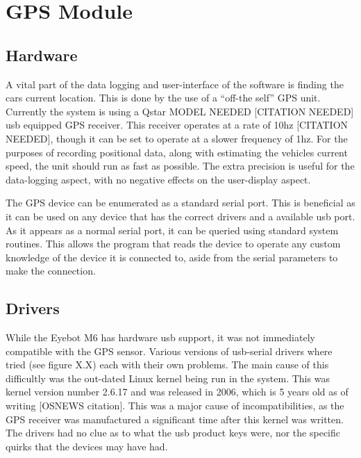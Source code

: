 

\section{GPS Module}

\subsection{Hardware}

A vital part of the data logging and user-interface of the software is finding the cars current location. This is done by the use of a “off-the self” GPS unit. Currently the system is using a Qstar MODEL NEEDED [CITATION NEEDED] usb equipped GPS receiver. This receiver operates at a rate of 10hz [CITATION NEEDED], though it can be set to operate at a slower frequency of 1hz. For the purposes of recording positional data, along with estimating the vehicles current speed, the unit should run as fast as possible. The extra precision is useful for the data-logging aspect, with no negative effects on the user-display aspect.  

The GPS device can be enumerated as a standard serial port. This is beneficial as it can be used on any device that has the correct drivers and a available usb port. As it appears as a normal serial port, it can be queried using standard system routines. This allows the program that reads the device to operate any custom knowledge of the device it is connected to, aside from the serial parameters to make the connection. 

\subsection{ Drivers}

While the Eyebot M6 has hardware usb support, it was not immediately compatible with the GPS sensor. Various versions of usb-serial drivers where tried (see figure X.X) each with their own problems. The main cause of this difficultly was the out-dated Linux kernel being run in the system. This was kernel version number 2.6.17 and was released in 2006, which is 5 years old as of writing [OSNEWS citation]. This was a major cause of incompatibilities, as the GPS receiver was manufactured a significant time after this kernel was written. The drivers had no clue as to what the usb product keys were, nor the specific quirks that the devices may have had.


